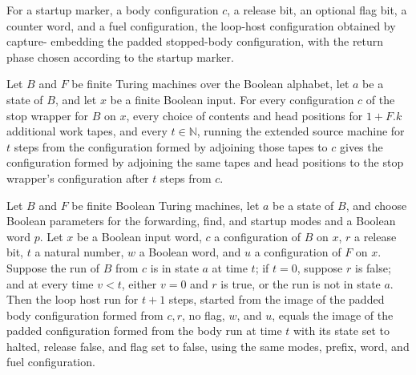 \begin{definition}
\label{Turing.FinTM.loopCall}
\leanok
{}
For a startup marker, a body configuration $c$, a release bit, an optional flag bit, a
counter word, and a fuel configuration, the loop-host configuration obtained by capture-
embedding the padded stopped-body configuration, with the return phase chosen according
to the startup marker.
\end{definition}

\begin{lemma}
\label{Turing.FinTM.loopBodySource_run}
\leanok
{}
Let $B$ and $F$ be finite Turing machines over the Boolean alphabet, let $a$ be a state
of $B$, and let $x$ be a finite Boolean input. For every configuration $c$ of the stop
wrapper for $B$ on $x$, every choice of contents and head positions for $1+F.k$
additional work tapes, and every $t\in\mathbb{N}$, running the extended source machine
for $t$ steps from the configuration formed by adjoining those tapes to $c$ gives the
configuration formed by adjoining the same tapes and head positions to the stop
wrapper's configuration after $t$ steps from $c$.
\end{lemma}

\begin{lemma}
\label{Turing.FinTM.loopHost_anchor_return}
\leanok
{}
Let $B$ and $F$ be finite Boolean Turing machines, let $a$ be a state of $B$, and choose
Boolean parameters for the forwarding, find, and startup modes and a Boolean word $p$.
Let $x$ be a Boolean input word, $c$ a configuration of $B$ on $x$, $r$ a release bit,
$t$ a natural number, $w$ a Boolean word, and $u$ a configuration of $F$ on $x$. Suppose
the run of $B$ from $c$ is in state $a$ at time $t$; if $t=0$, suppose $r$ is false; and
at every time $v<t$, either $v=0$ and $r$ is true, or the run is not in state $a$. Then
the loop host run for $t+1$ steps, started from the image of the padded body
configuration formed from $c,r$, no flag, $w$, and $u$, equals the image of the padded
configuration formed from the body run at time $t$ with its state set to halted, release
false, and flag set to false, using the same modes, prefix, word, and fuel
configuration.
\end{lemma}

